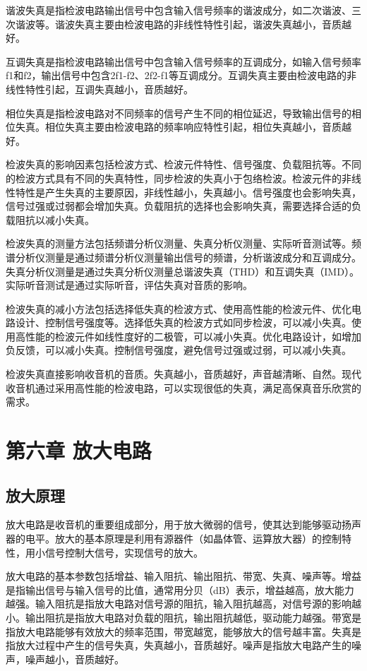 \documentclass[12pt,UTF8]{ctexbook}
\begin{document}
谐波失真是指检波电路输出信号中包含输入信号频率的谐波成分，如二次谐波、三次谐波等。谐波失真主要由检波电路的非线性特性引起，谐波失真越小，音质越好。

互调失真是指检波电路输出信号中包含输入信号频率的互调成分，如输入信号频率f1和f2，输出信号中包含2f1-f2、2f2-f1等互调成分。互调失真主要由检波电路的非线性特性引起，互调失真越小，音质越好。

相位失真是指检波电路对不同频率的信号产生不同的相位延迟，导致输出信号的相位失真。相位失真主要由检波电路的频率响应特性引起，相位失真越小，音质越好。

检波失真的影响因素包括检波方式、检波元件特性、信号强度、负载阻抗等。不同的检波方式具有不同的失真特性，同步检波的失真小于包络检波。检波元件的非线性特性是产生失真的主要原因，非线性越小，失真越小。信号强度也会影响失真，信号过强或过弱都会增加失真。负载阻抗的选择也会影响失真，需要选择合适的负载阻抗以减小失真。

检波失真的测量方法包括频谱分析仪测量、失真分析仪测量、实际听音测试等。频谱分析仪测量是通过频谱分析仪测量输出信号的频谱，分析谐波成分和互调成分。失真分析仪测量是通过失真分析仪测量总谐波失真（THD）和互调失真（IMD）。实际听音测试是通过实际听音，评估失真对音质的影响。

检波失真的减小方法包括选择低失真的检波方式、使用高性能的检波元件、优化电路设计、控制信号强度等。选择低失真的检波方式如同步检波，可以减小失真。使用高性能的检波元件如线性度好的二极管，可以减小失真。优化电路设计，如增加负反馈，可以减小失真。控制信号强度，避免信号过强或过弱，可以减小失真。

检波失真直接影响收音机的音质。失真越小，音质越好，声音越清晰、自然。现代收音机通过采用高性能的检波电路，可以实现很低的失真，满足高保真音乐欣赏的需求。

\chapter{第六章 放大电路}

\section{放大原理}

放大电路是收音机的重要组成部分，用于放大微弱的信号，使其达到能够驱动扬声器的电平。放大的基本原理是利用有源器件（如晶体管、运算放大器）的控制特性，用小信号控制大信号，实现信号的放大。

放大电路的基本参数包括增益、输入阻抗、输出阻抗、带宽、失真、噪声等。增益是指输出信号与输入信号的比值，通常用分贝（dB）表示，增益越高，放大能力越强。输入阻抗是指放大电路对信号源的阻抗，输入阻抗越高，对信号源的影响越小。输出阻抗是指放大电路对负载的阻抗，输出阻抗越低，驱动能力越强。带宽是指放大电路能够有效放大的频率范围，带宽越宽，能够放大的信号越丰富。失真是指放大过程中产生的信号失真，失真越小，音质越好。噪声是指放大电路产生的噪声，噪声越小，音质越好。
\end{document}
